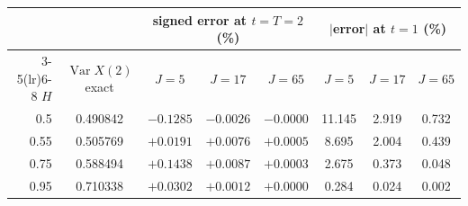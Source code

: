 \begin{tabular}{rccccccc}\toprule
 & & \multicolumn{3}{c}{signed error at $t=T=2$ (\%)} & \multicolumn{3}{c}{$|$error$|$ at $t=1$ (\%)}\\\cmidrule(lr){3-5}\cmidrule(lr){6-8}
$H$ & $\operatorname{Var}X(2)$ exact & $J=5$ & $J=17$ & $J=65$ & $J=5$ & $J=17$ & $J=65$\\\midrule
0.5 & 0.490842 & $-0.1285$ & $-0.0026$ & $-0.0000$ & 11.145 & 2.919 & 0.732 \\
0.55 & 0.505769 & $+0.0191$ & $+0.0076$ & $+0.0005$ & 8.695 & 2.004 & 0.439 \\
0.75 & 0.588494 & $+0.1438$ & $+0.0087$ & $+0.0003$ & 2.675 & 0.373 & 0.048 \\
0.95 & 0.710338 & $+0.0302$ & $+0.0012$ & $+0.0000$ & 0.284 & 0.024 & 0.002 \\
\bottomrule\end{tabular}